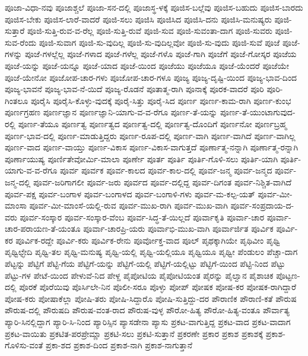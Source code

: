 {ಪೂಜಾ-ವಿಧಾ-ನವು
ಪೂಜಾಶ್ಚಲೆ
ಪೂಜಾ-ಸನ-ದಲ್ಲಿ
ಪೂಜಾಸ್ಥ-ಳಕ್ಕೆ
ಪೂಜಿಸ-ಬಲ್ಲೆವು
ಪೂಜಿಸ-ಬಹುದು
ಪೂಜಿಸ-ಬಾರದು
ಪೂಜಿಸ-ಬೇಕು
ಪೂಜಿಸ-ಲಾರೆ-ವಾದರೆ
ಪೂಜಿ-ಸಲು
ಪೂಜಿಸಿ
ಪೂಜಿಸಿದ
ಪೂಜಿಸಿ-ದನು
ಪೂಜಿಸಿ-ಮನುಷ್ಯರು
ಪೂಜಿ-ಸುತ್ತಾರೆ
ಪೂಜಿ-ಸುತ್ತಿ-ರುವ-ವ-ರೆಲ್ಲ
ಪೂಜಿ-ಸುತ್ತಿ-ರುವೆ
ಪೂಜಿ-ಸುವ
ಪೂಜಿ-ಸುವಂತಾ-ದಾಗ
ಪೂಜಿ-ಸುವರು
ಪೂಜಿ-ಸುವ-ರೆಂದು
ಪೂಜಿ-ಸುವಾಗ
ಪೂಜಿ-ಸು-ವುದಿಲ್ಲ
ಪೂಜಿ-ಸು-ವುದಿಲ್ಲವೋ
ಪೂಜಿ-ಸು-ವುದು
ಪೂಜಿ-ಸುವೆ
ಪೂಜೆ
ಪೂಜೆ-ಗಳನ್ನು
ಪೂಜೆ-ಗಳಲ್ಲೆಲ್ಲ
ಪೂಜೆ-ಗಳಾದ
ಪೂಜೆ-ಗಳೆಲ್ಲ
ಪೂಜೆ-ಗಳೊ
ಪೂಜೆ-ಗಾಗಿ
ಪೂಜೆಗೆ
ಪೂಜೆ-ಗೋಸ್ಕರ
ಪೂಜೆಯ
ಪೂಜೆ-ಯನ್ನು
ಪೂಜೆ-ಯನ್ನೂ
ಪೂಜೆ-ಯಾದ
ಪೂಜೆ-ಯಿಂದ
ಪೂಜೆಯು
ಪೂಜೆಯೂ
ಪೂಜೆ-ಯೆಂದರೆ
ಪೂಜೆಯೇ
ಪೂಜೆ-ಯೇನೋ
ಪೂಜೋಪ-ಚಾರ-ಗಳು
ಪೂಜೋಪ-ಚಾರ-ಗಳೂ
ಪೂಜ್ಯ
ಪೂಜ್ಯ-ದೃಷ್ಟಿ-ಯಿಂದ
ಪೂಜ್ಯ-ಭಾವ-ದಿಂದ
ಪೂಜ್ಯ-ಭಾವನೆ
ಪೂಜ್ಯ-ಭಾವ-ನೆ-ಯಿದೆ
ಪೂಜ್ಯ-ರೊಡನೆ
ಪೂತಾತ್ಮ-ರಾಗಿ
ಪೂನಾಕ್ಕೆ
ಪೂರಕ-ವಾದರೆ
ಪೂರಿ
ಪೂರಿ-ಗಿಂತಲೂ
ಪೂರೈಸಿ
ಪೂರೈಸಿ-ಕೊಳ್ಳು-ವುದಕ್ಕೆ
ಪೂರೈ-ಸಿತ್ತು
ಪೂರೈ-ಸಿದ
ಪೂರ್ಣ
ಪೂರ್ಣ-ಕಾಮ-ರಾಗಿ
ಪೂರ್ಣ-ಕುಂಭ
ಪೂರ್ಣಗ್ರಹಣ
ಪೂರ್ಣಜ್ಞಾನ
ಪೂರ್ಣಜ್ಞಾನಿ-ಯಾಗು-ವ-ವ-ರೆಗೂ
ಪೂರ್ಣ-ತೆ-ಯನ್ನು
ಪೂರ್ಣ-ತೆ-ಯುಂಟಾಗುವುದ-ರಲ್ಲಿ
ಪೂರ್ಣ-ತೆಯೂ
ಪೂರ್ಣತ್ವ
ಪೂರ್ಣತ್ವದ
ಪೂರ್ಣತ್ವ-ದಲ್ಲಿ
ಪೂರ್ಣತ್ವ-ದೊಂದಿಗೆ
ಪೂರ್ಣನೋ
ಪೂರ್ಣಬ್ರಹ್ಮ
ಪೂರ್ಣ-ಭಾವ-ದಲ್ಲಿ
ಪೂರ್ಣ-ಮಾಡುತ್ತಿದ್ದರು
ಪೂರ್ಣ-ರೂಪ-ದಲ್ಲಿ
ಪೂರ್ಣ-ವಾಗಿ
ಪೂರ್ಣ-ವಾಗಿದೆ
ಪೂರ್ಣ-ವಾಗಿಲ್ಲ
ಪೂರ್ಣ-ವಾದ
ಪೂರ್ಣ-ವಾಯ್ತು
ಪೂರ್ಣ-ವಿಕಾಸ
ಪೂರ್ಣ-ವಿಕಾಸ-ವಾಗುತ್ತದೆ
ಪೂರ್ಣಾತ್ಮ-ನನ್ನಾಗಿ
ಪೂರ್ಣಾತ್ಮ-ರನ್ನಾಗಿ
ಪೂರ್ಣಾಯುಷ್ಯ
ಪೂರ್ಣಿತೇವೋರ್ಮಿ-ಮಾಲಾ
ಪೂರ್ಣೇ
ಪೂರ್ತ
ಪೂರ್ತಿ
ಪೂರ್ತಿ-ಗೊಳಿ-ಸಲು
ಪೂರ್ತಿ-ಯಾಗಿ
ಪೂರ್ತಿ-ಯಾಗು-ವ-ವ-ರೆಗೂ
ಪೂರ್ವ
ಪೂರ್ವಕ
ಪೂರ್ವ-ಕಾಲದ
ಪೂರ್ವ-ಕಾಲ-ದಲ್ಲಿ
ಪೂರ್ವ-ಜನ್ಮ
ಪೂರ್ವ-ಜನ್ಮದ
ಪೂರ್ವ-ಜನ್ಮ-ದಲ್ಲಿ
ಪೂರ್ವ-ಜರಿಗಾಗಲೀ
ಪೂರ್ವ-ಜರು
ಪೂರ್ವದ
ಪೂರ್ವ-ದಲ್ಲಿದ್ದ
ಪೂರ್ವ-ದಿಗಂತ
ಪೂರ್ವ-ನಿಶ್ಚಿತ-ವಾಗಿದೆ
ಪೂರ್ವ-ಪಕ್ಷ
ಪೂರ್ವ-ಬಂಗಾಳ
ಪೂರ್ವ-ಬಂಗಾಳದ
ಪೂರ್ವ-ಬಂಗಾಳಿ-ಗಳು
ಪೂರ್ವ-ಮ-ಕಲ್ಪ-ಯತ್
ಪೂರ್ವ-ಮೀ-ಮಾಂಸಾ
ಪೂರ್ವ-ಮೀ-ಮಾಂಸೆ-ಯಲ್ಲಿ-ರುವ
ಪೂರ್ವ-ಮುಖ-ರಾಗಿ
ಪೂರ್ವ-ಮುಖ-ವಾಗಿ
ಪೂರ್ವ-ಸಂಪ್ರದಾಯ-ದ-ವರು
ಪೂರ್ವ-ಸಂಸ್ಕಾರ
ಪೂರ್ವ-ಸಂಸ್ಕಾರ-ವೆಂಬ
ಪೂರ್ವ-ಸಿದ್ಧ-ತೆ-ಯಿಲ್ಲದೆ
ಪೂರ್ವಾಕೃತಿ
ಪೂರ್ವಾ-ಚಾರ
ಪೂರ್ವಾ-ಚಾರ-ಪರಾಯಣ-ತೆ-ಯಂತೂ
ಪೂರ್ವಾ-ಚಾರಪ್ರಿ-ಯರು
ಪೂರ್ವಾಭಿ-ಮುಖ-ವಾಗಿ
ಪೂರ್ವಾರ್ಜಿತ
ಪೂರ್ವಿಕ
ಪೂರ್ವಿ-ಕರ
ಪೂರ್ವಿಕ-ರದ್ದೇ
ಪೂರ್ವಿ-ಕರು
ಪೂರ್ವಿಕ-ರೇನು
ಪೂರ್ವೋಕ್ತ-ವಾದ
ಪೂಲ್
ಪೃಥಕ್ಕಾಗಿಯೇ
ಪೃಥಿವೀಂ
ಪೃಥ್ವಿ
ಪೃಥ್ವಿಛ್ಛೇದಿ
ಪೃಥ್ವಿ-ತಲ
ಪೃಥ್ವಿ-ಮನುಷ್ಯ
ಪೃಥ್ವಿ-ಯಲ್ಲಿ
ಪೃಥ್ವಿ-ಯಲ್ಲಿಯೂ
ಪೃಥ್ವಿಯೂ
ಪೃಥ್ವೀ
ಪೆಂಡುಲಂ
ಪೆಚ್ಚಾ-ದಾಗ
ಪೆಟ್ಟನ್ನು
ಪೆಟ್ಟಿಗೆ
ಪೆಟ್ಟಿ-ಗೆಯ
ಪೆಟ್ಟಿಗೆ-ಯನ್ನು
ಪೆಟ್ಟಿಗೆ-ಯಲ್ಲಿ
ಪೆಟ್ಟಿಗೆ-ಯಲ್ಲಿಟ್ಟು
ಪೆಟ್ಟಿಗೆ-ಯಿಂದ
ಪೆಟ್ಟಿ-ನಿಂದ
ಪೆಟ್ಟು
ಪೆಟ್ಟು-ಗಳ
ಪೇಟೆ-ಯಿಂದ
ಪೇಳುವೆ-ನಿದ
ಪೇಳ್ದ
ಪೈಪೋಟಿಯ
ಪೈಪೋಟಿಯಂತ
ಪೈರನ್ನು
ಪೈಲ್ವಾನ
ಪೈಶಾಚಿಕ
ಪೊಟ್ಟಣ-ದಲ್ಲಿ
ಪೊರಕೆ
ಪೊರೆಯಿವು
ಪೊರ್ಸಿಲೇ-ನಿನ
ಪೊಲೀ-ಸರೂ
ಪೊಳ್ಳು
ಪೋಪ್
ಪೋಷಕ
ಪೋಷ-ಕರ
ಪೋಷಕ-ರಾಗಿದ್ದಾರೆ
ಪೋಷ-ಕರು
ಪೋಷಾಕೆಲ್ಲಾ
ಪೋಷಿ-ತರು
ಪೋಷಿ-ಸಿದ್ದಾರೊ
ಪೋಷಿ-ಸುತ್ತಿದ್ದು-ದರ
ಪೌರಾಣಿಕ
ಪೌರಾಣಿ-ಕತೆ
ಪೌರುಷ
ಪೌರುಷ-ದಲ್ಲಿ
ಪೌರುಷದಿ
ಪೌರುಷ-ವಂತ-ರಾದ
ಪೌರುಷ-ವುಳ್ಳ
ಪೌರೋ-ಹಿತ್ಯ
ಪೌರೋ-ಹಿತ್ಯ-ವಂತೂ
ಪೌರ್ವಾತ್ಯ
ಪ್ಯಾರಿ-ಸಿನಲ್ಲಿದ್ದಾಗ
ಪ್ಯಾರಿ-ಸಿ-ನಿಂದ
ಪ್ಯಾರಿಸ್ಸಿನ
ಪ್ಯಾಸಡೇನಾ
ಪ್ಯಾಸು
ಪ್ರಕಟ-ವಾಗುತ್ತಿದ್ದ
ಪ್ರಕಟ-ವಾದ
ಪ್ರಕಟ-ವಾದಾಗ
ಪ್ರಕಟ-ವಾಯಿತು
ಪ್ರಕಟಿತ-ಪರಪ್ರೇಮ್ಣಾ
ಪ್ರಕಟಿ-ಸಲು
ಪ್ರಕಟಿ-ಸುತ್ತಾನೆ
ಪ್ರಕರಣೇ
ಪ್ರಕಾರ
ಪ್ರಕಾಶ
ಪ್ರಕಾಶಕ್ಕೆ
ಪ್ರಕಾಶ-ಗೊಳಿಸು-ವಂತೆ
ಪ್ರಕಾ-ಶದ
ಪ್ರಕಾಶ-ದಿಂದ
ಪ್ರಕಾಶ-ನಾಗಿ
ಪ್ರಕಾಶ-ನಾಗುತ್ತಾನೆ
}
